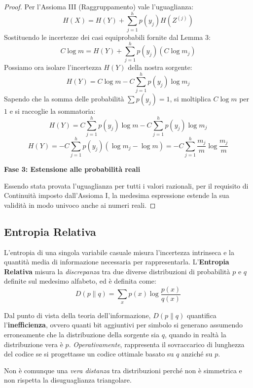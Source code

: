 \begin{proof}
Per l'Assioma III (Raggruppamento) vale l'uguaglianza: 
\[ H(X) = H(Y) + \sum_{j=1}^{h} p(y_j) H(Z^{(j)}) \]
Sostituendo le incertezze dei casi equiprobabili fornite dal Lemma 3: 
\[ C \log m = H(Y) + \sum_{j=1}^{h} p(y_j) \left( C \log m_j \right) \] 
Possiamo ora isolare l'incertezza $H(Y)$ della nostra sorgente: 
\[ H(Y) = C \log m - C \sum_{j=1}^{h} p(y_j) \log m_j \] 
Sapendo che la somma delle probabilità $\sum p(y_j) = 1$, si moltiplica $C \log m$ per $1$ e si raccoglie la sommatoria:
\[ H(Y) = C \sum_{j=1}^{h} p(y_j) \log m - C \sum_{j=1}^{h} p(y_j) \log m_j \]
\[ H(Y) = -C \sum_{j=1}^{h} p(y_j) (\log m_j - \log m) = -C \sum_{j=1}^{h} \frac{m_j}{m} \log \frac{m_j}{m} \] 

\medskip
\noindent\textbf{Fase 3: Estensione alle probabilità reali} 

Essendo stata provata l'uguaglianza per tutti i valori razionali, per il requisito di Continuità imposto dall'Assioma I, la medesima espressione estende la sua validità in modo univoco anche ai numeri reali. 
\end{proof}

\subsection{Entropia Relativa}
L'entropia di una singola variabile casuale misura l'incertezza intrinseca e la quantità media di informazione necessaria per rappresentarla.
L'\textbf{Entropia Relativa} misura la \textit{discrepanza} tra due diverse distribuzioni di probabilità $p$ e $q$ definite sul medesimo alfabeto, ed è definita come:
\[ D(p \parallel q) = \sum_{x} p(x) \log \frac{p(x)}{q(x)} \]

Dal punto di vista della teoria dell'informazione, $D(p \parallel q)$ quantifica l'\textbf{inefficienza}, ovvero quanti bit aggiuntivi per simbolo si generano assumendo erroneamente che la distribuzione della sorgente sia $q$, quando in realtà la distribuzione vera è $p$. \textit{Operativamente}, rappresenta il sovraccarico di lunghezza del codice se si progettasse un codice ottimale basato su $q$ anziché su $p$.

Non è comunque una \textit{vera distanza} tra distribuzioni perché non è simmetrica e non rispetta la disuguaglianza triangolare.
